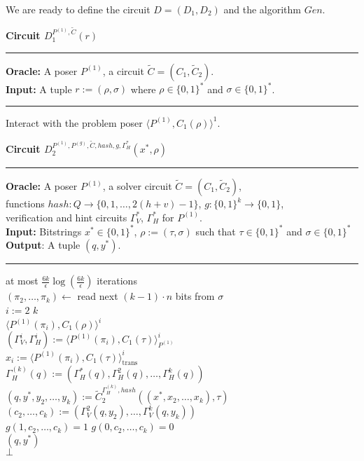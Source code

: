 %
We are ready to define the circuit $D = (D_1, D_2)$ and the algorithm $Gen$.
%
\begin{codeblock}
  \textbf{Circuit $D_1^{P^{(1)}, \widetilde{C}}(r)$}
  \medskip \hrule \medskip
  \textbf{Oracle:} A poser $P^{(1)}$, a circuit $\widetilde{C} = (C_1, \widetilde{C}_2)$.\\
  \textbf{Input:} A tuple $r := (\rho, \sigma)$ where $ \rho \in \{0,1\}^{*}$ and $\sigma \in \{0,1\}^{*}$.
  \medskip\hrule\medskip
  Interact with the problem poser $\langle P^{(1)}, C_1(\rho) \rangle^1$.
\end{codeblock}
%
\begin{codeblock}
  \textbf{Circuit $D_2^{P^{(1)}, P^{(g)}, \widetilde{C}, hash, g,  \Gamma_H^*}(x^*, \rho)$}
  \medskip \hrule \medskip
  \textbf{Oracle:} A poser $P^{(1)}$, a solver circuit $\widetilde{C} = (C_1, \widetilde{C}_2)$, \\
  \IndII functions $hash : Q \rightarrow \{0,1, \dots, 2(h+v)-1\}$, $g:\{0,1\}^k \rightarrow \{0,1\}$, \\
  \IndII verification and hint circuits $\Gamma_V^*$, $\Gamma_H^*$ for $P^{(1)}$. \\
  \textbf{Input:} Bitstrings $x^* \in \{0,1\}^{*}$, $\rho := (\tau, \sigma)$ such that $\tau \in \{0,1\}^{*}$ and $\sigma \in \{0,1\}^{*}$\\
  \textbf{Output}: A tuple $(q, y^*)$.
  \medskip \hrule \medskip
  \For at most $\frac{6k}{\epsilon} \log(\frac{6k}{\epsilon})$ iterations \Do \\
  \IndI $(\pi_2, \dots, \pi_k) \leftarrow$ read next $(k-1)\cdot n$ bits from $\sigma$ \\
  \IndI \For $i:=2$ \To $k$ \Do \\
  \IndII \Run $\langle P^{(1)}(\pi_i), C_1(\rho)\rangle^i$ \\
  \IndIII $(\Gamma_V^{i}, \Gamma_H^{i}) := \langle P^{(1)}(\pi_i), C_1(\tau) \rangle^i_{P^{(1)}}$ \\
  \IndIII $x_i := \langle P^{(1)}(\pi_i), C_1(\tau) \rangle^i_{\text{trans}}$ \\
  \IndI $\Gamma_H^{(k)}(q) := (\Gamma_H^{*}(q), \Gamma_H^{2}(q), \dots, \Gamma_H^{k}(q))$ \\
  \IndI $(q, y^*, y_2, \dots, y_k) := \widetilde{C}_2^{\Gamma_H^{(k)}, hash}((x^*, x_2, \dots, x_k), \tau)$\\
  \IndI $(c_2, \dots, c_k) := (\Gamma_V^2(q, y_2), \dots, \Gamma_V^{k}(q, y_k))$ \\
  \IndI \If $g(1, c_{2}, \dots, c_k) = 1$ \And $g(0,c_{2}, \dots, c_k) = 0$ \Then \\
  \IndII \Return $(q, y^*)$ \\
  \Return $\bot$
%
\end{codeblock}
